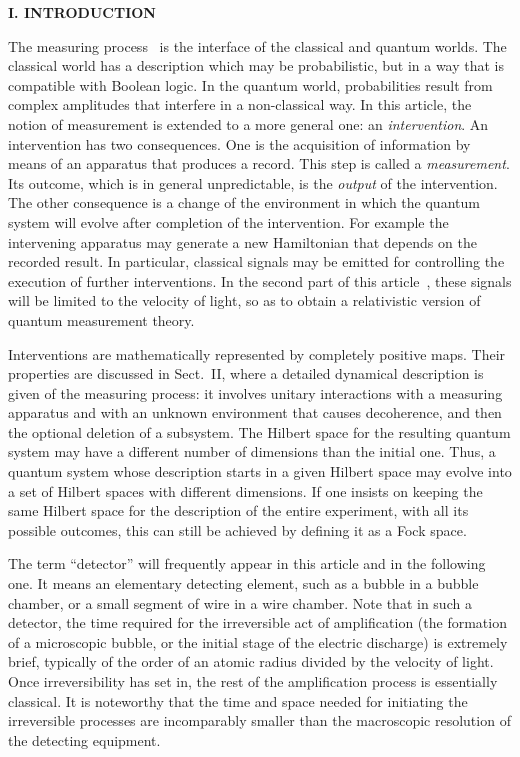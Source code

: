 \newpage \begin{center}{\bf I. INTRODUCTION}\ec

The measuring process~\cite{vN,WZ} is the interface of the classical and
quantum worlds. The classical world has a description which may be
probabilistic, but in a way that is compatible with Boolean logic. In
the quantum world, probabilities result from complex amplitudes that
interfere in a non-classical way. In this article, the notion of
measurement is extended to a more general one: an {\it intervention\/}.
An intervention has two consequences. One is the acquisition of
information by means of an apparatus that produces a record. This step
is called a {\it measurement\/}. Its outcome, which is in general
unpredictable, is the {\it output\/} of the intervention. The other
consequence is a change of the environment in which the quantum system
will evolve after completion of the intervention. For example the
intervening apparatus may generate a new Hamiltonian that depends on the
recorded result. In particular, classical signals may be emitted for
controlling the execution of further interventions. In the second part
of this article~\cite{II}, these signals will be limited to the velocity
of light, so as to obtain a relativistic version of quantum measurement
theory.

Interventions are mathematically represented by completely positive
maps. Their properties are discussed in Sect.~II, where a detailed
dynamical description is given of the measuring process: it involves
unitary interactions with a measuring apparatus and with an unknown
environment that causes decoherence, and then the optional deletion of a
subsystem. The Hilbert space for the resulting quantum system may have a
different number of dimensions than the initial one. Thus, a quantum
system whose description starts in a given Hilbert space may evolve into
a set of Hilbert spaces with different dimensions. If one insists on
keeping the same Hilbert space for the description of the entire
experiment, with all its possible outcomes, this can still be achieved
by defining it as a Fock space.

The term ``detector'' will frequently appear in this article and in the
following one. It means an elementary detecting element, such as a
bubble in a bubble chamber, or a small segment of wire in a wire
chamber. Note that in such a detector, the time required for the
irreversible act of amplification (the formation of a microscopic
bubble, or the initial stage of the electric discharge) is extremely
brief, typically of the order of an atomic radius divided by the
velocity of light. Once irreversibility has set in, the rest of the
amplification process is essentially classical. It is noteworthy that
the time and space needed for initiating the irreversible processes are
incomparably smaller than the macroscopic resolution of the detecting
equipment.


\end{center}
